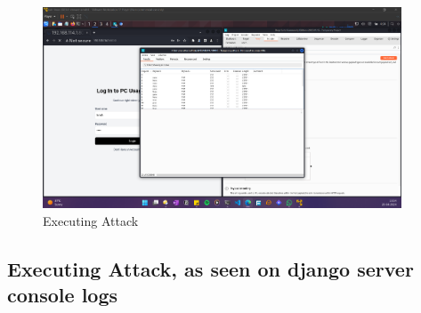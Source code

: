 \documentclass[11pt]{article}
\begin{document}
\begin{figure}[H]
    \centering
    \includegraphics[width=0.95\textwidth]{burpsuite (9).png}
    \caption{Executing Attack}
    \label{fig:1}
\end{figure}
\subsection{Executing Attack, as seen on django server console logs}



\end{document}
